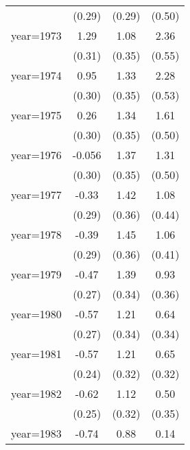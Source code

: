 \begin{sidewaystable}[htbp]
\begin{tabular}{l*{3}{c}}
                &   (0.29)         &   (0.29)         &   (0.50)         \\
\addlinespace
year=1973       &     1.29\sym{***}&     1.08\sym{***}&     2.36\sym{***}\\
                &   (0.31)         &   (0.35)         &   (0.55)         \\
\addlinespace
year=1974       &     0.95\sym{***}&     1.33\sym{***}&     2.28\sym{***}\\
                &   (0.30)         &   (0.35)         &   (0.53)         \\
\addlinespace
year=1975       &     0.26         &     1.34\sym{***}&     1.61\sym{***}\\
                &   (0.30)         &   (0.35)         &   (0.50)         \\
\addlinespace
year=1976       &   -0.056         &     1.37\sym{***}&     1.31\sym{**} \\
                &   (0.30)         &   (0.35)         &   (0.50)         \\
\addlinespace
year=1977       &    -0.33         &     1.42\sym{***}&     1.08\sym{**} \\
                &   (0.29)         &   (0.36)         &   (0.44)         \\
\addlinespace
year=1978       &    -0.39         &     1.45\sym{***}&     1.06\sym{**} \\
                &   (0.29)         &   (0.36)         &   (0.41)         \\
\addlinespace
year=1979       &    -0.47\sym{*}  &     1.39\sym{***}&     0.93\sym{**} \\
                &   (0.27)         &   (0.34)         &   (0.36)         \\
\addlinespace
year=1980       &    -0.57\sym{**} &     1.21\sym{***}&     0.64\sym{*}  \\
                &   (0.27)         &   (0.34)         &   (0.34)         \\
\addlinespace
year=1981       &    -0.57\sym{**} &     1.21\sym{***}&     0.65\sym{**} \\
                &   (0.24)         &   (0.32)         &   (0.32)         \\
\addlinespace
year=1982       &    -0.62\sym{**} &     1.12\sym{***}&     0.50         \\
                &   (0.25)         &   (0.32)         &   (0.35)         \\
\addlinespace
year=1983       &    -0.74\sym{***}&     0.88\sym{***}&     0.14         \\

\end{tabular}
\end{sidewaystable}
